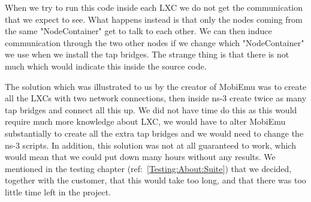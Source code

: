 	When we try to run this code inside each \gls{LXC} we do not get the communication that we expect to see. What happens instead is that only the nodes coming from the same "NodeContainer" get to talk to each other. We can then induce communication through the two other nodes if we change which "NodeContainer" we use when we install the tap bridges. The strange thing is that there is not much which would indicate this inside the source code.
	
	The solution which was illustrated to us by the creator of MobiEmu was to create all the LXCs with two network connections, then inside ns-3 create twice as many tap bridges and connect all this up. We did not have time do this as this would require much more knowledge about LXC, we would have to alter MobiEmu substantially to create all the extra tap bridges and we would need to change the ns-3 scripts. In addition, this solution was not at all guaranteed to work, which would mean that we could put down many hours without any results. We mentioned in the testing chapter (ref:~\ref{Testing:About:Suite}) that we decided, together with the customer, that this would take too long, and that there was too little time left in the project.

